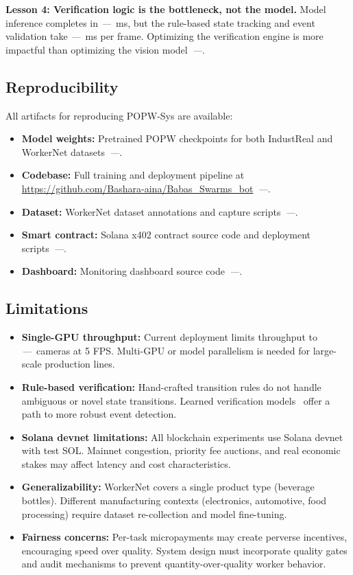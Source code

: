 \documentclass[10pt,twocolumn]{article}
\newcommand{\popw}{POPW}
\newcommand{\popwsys}{POPW-Sys}
\newcommand{\todo}{\textit{---}}
\newcommand{\popwres}{\todo}
\begin{document}
\textbf{Lesson 4: Verification logic is the bottleneck, not the model.} Model inference completes in \popwres~ms, but the rule-based state tracking and event validation take \popwres~ms per frame. Optimizing the verification engine is more impactful than optimizing the vision model~\popwres.

\subsection{Reproducibility}

All artifacts for reproducing \popwsys{} are available:
\begin{itemize}[nosep]
\item \textbf{Model weights:} Pretrained \popw{} checkpoints for both IndustReal and WorkerNet datasets~\popwres.
\item \textbf{Codebase:} Full training and deployment pipeline at \url{https://github.com/Bashara-aina/Babas_Swarms_bot}~\popwres.
\item \textbf{Dataset:} WorkerNet dataset annotations and capture scripts~\popwres.
\item \textbf{Smart contract:} Solana x402 contract source code and deployment scripts~\popwres.
\item \textbf{Dashboard:} Monitoring dashboard source code~\popwres.
\end{itemize}

\subsection{Limitations}

\begin{itemize}[nosep]
\item \textbf{Single-GPU throughput:} Current deployment limits throughput to \popwres~cameras at 5 FPS. Multi-GPU or model parallelism is needed for large-scale production lines.
\item \textbf{Rule-based verification:} Hand-crafted transition rules do not handle ambiguous or novel state transitions. Learned verification models~\cite{lehman2024statediffnet} offer a path to more robust event detection.
\item \textbf{Solana devnet limitations:} All blockchain experiments use Solana devnet with test SOL. Mainnet congestion, priority fee auctions, and real economic stakes may affect latency and cost characteristics.
\item \textbf{Generalizability:} WorkerNet covers a single product type (beverage bottles). Different manufacturing contexts (electronics, automotive, food processing) require dataset re-collection and model fine-tuning.
\item \textbf{Fairness concerns:} Per-task micropayments may create perverse incentives, encouraging speed over quality. System design must incorporate quality gates and audit mechanisms to prevent quantity-over-quality worker behavior.
\end{itemize}
\end{document}

